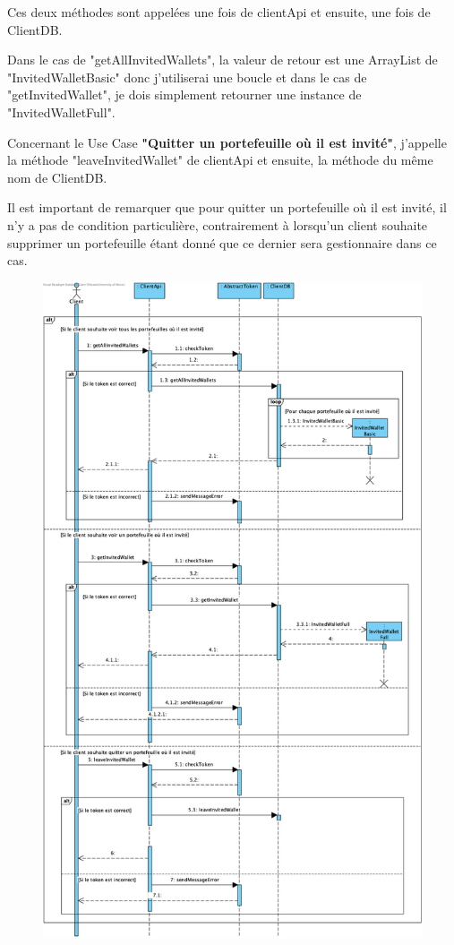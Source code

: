 \begin{flushleft}
Ces deux méthodes sont appelées une fois de clientApi et ensuite, une fois de ClientDB.
\end{flushleft}

\begin{flushleft}
Dans le cas de "getAllInvitedWallets", la valeur de retour est une ArrayList de "InvitedWalletBasic" donc j'utiliserai une boucle et dans le cas de "getInvitedWallet", je dois simplement retourner une instance de "InvitedWalletFull".
\end{flushleft}

\begin{flushleft}
Concernant le Use Case \textbf{"Quitter un portefeuille où il est invité"}, j'appelle la méthode "leaveInvitedWallet" de clientApi et ensuite, la méthode du même nom de ClientDB.
\end{flushleft}

\begin{flushleft}
Il est important de remarquer que pour quitter un portefeuille où il est invité, il n'y a pas de condition particulière, contrairement à lorsqu'un client souhaite supprimer un portefeuille étant donné que ce dernier sera gestionnaire dans ce cas.
\end{flushleft}

\newpage
\begin{figure}[h]
\centering
\includegraphics[height = 1.2\textwidth]{Extension-claire/Sequence-claire/img/seqOuInvité.png}
\end{figure}

